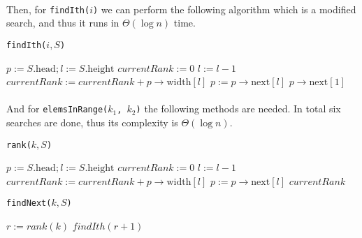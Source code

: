 \documentclass[../main.tex]{subfiles}
\begin{document}
\paragraph{} Then, for \texttt{findIth(\(i\))} we can perform the following algorithm which is a modified search, and thus it runs in \(\Theta(\log n)\) time.

\begin{algorithm}
\caption{\texttt{findIth(\(i, S\))}}
\label{alg:ex2.findIth}
\begin{algorithmic}
  \State \(p := S.\text{head}; l := S.\text{height}\)
  \State \(currentRank := 0\)
      \State \(l := l - 1\)
    \Else
      \State \(currentRank := currentRank + p \rightarrow \text{width}[l]\)
      \State \(p := p \rightarrow \text{next}[l]\)
    \EndIf
  \EndWhile
  \State \Return \(p \rightarrow \text{next}[1]\)
\end{algorithmic}
\end{algorithm}

\paragraph{} And for \texttt{elemsInRange(\(k_{1}\), \(k_{2}\))} the following methods are needed. In total six searches are done, thus its complexity is \(\Theta(\log n)\).

\begin{algorithm}
\caption{\texttt{rank(\(k, S\))}}
\label{alg:ex2.rank}
\begin{algorithmic}
  \State \(p := S.\text{head}; l := S.\text{height}\)
  \State \(currentRank := 0\)
      \State \(l := l - 1\)
    \Else
      \State \(currentRank := currentRank + p \rightarrow \text{width}[l]\)
      \State \(p := p \rightarrow \text{next}[l]\)
    \EndIf
  \EndWhile
  \State \Return \(currentRank\)
\end{algorithmic}
\end{algorithm}

\begin{algorithm}
\caption{\texttt{findNext(\(k, S\))}}
\label{alg:ex2.findNext}
\begin{algorithmic}
  \State \(r := rank(k)\)
  \State \Return \(findIth(r+1)\)
\end{algorithmic}
\end{algorithm}
\end{document}
